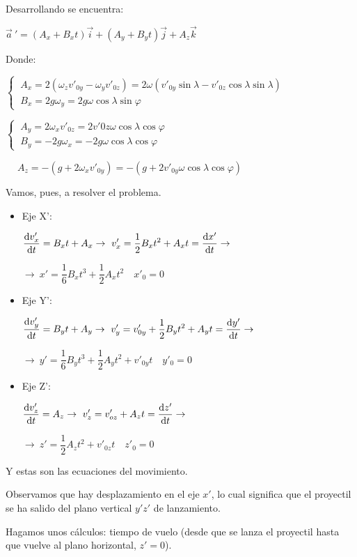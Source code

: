 Desarrollando se encuentra:

$\vec a\ '=(A_x+B_xt)\vec i+(A_y+B_yt)\vec j+A_z\vec k$

Donde:



$\begin{cases}
\ A_x=2(\omega_z v'_{0y}-\omega_y v'_{0z})=2\omega(v'_{0y}\sin \lambda-v'_{0z} \cos \lambda \sin \lambda	 )\\
\ B_x=2g\omega_y=2g\omega \cos \lambda \sin \varphi
\end{cases}$


$\begin{cases}
\ A_y=2\omega_xv'_{0z}=2v'0z \omega \cos \lambda \cos \varphi\\
\ B_y=-2g\omega_x=-2g\omega \cos \lambda \cos \varphi
\end{cases}$

$\quad \ A_z=-(g+2\omega_x v'_{0y})=-(g+2v'_{0y}\omega \cos \lambda \cos \varphi)$


Vamos, pues, a resolver el problema.

\begin{itemize}
\item Eje X':

$\displaystyle \dv{v'_x}{t}=B_xt+A_x \to \ v'_x=\dfrac 1 2 B_x t^2 + A_x t =\dv{x'}{t} \to$

$\to  \ x'=\dfrac 1 6 B_x t^3+\dfrac 1 2 A_x t^2\quad x'_0=0$
\item Eje Y':

$\displaystyle \dv{v'_y}{t}=B_y t+A_y \to \ v'_y=v'_{0y}+\dfrac 1 2 B_y t^2 + A_y t =\dv{y'}{t} \to$

$\to  \ y'=\dfrac 1 6 B_y t^3+\dfrac 1 2 A_y t^2 +v'_{0y}t \quad y'_0=0$
\item Eje Z':

$\displaystyle \dv{v'_z}{t}=A_z \to \ v'_z=v'_{oz}+ A_z t =\dv{z'}{t} \to$

$\to  \ z'=\dfrac 1 2 A_z t^2 + v'_{0z}t \quad z'_0=0$

\end{itemize}

Y estas son las ecuaciones del movimiento.

Observamos que hay desplazamiento en el eje $x'$, lo cual significa que el proyectil se ha salido del plano vertical $y'z'$ de lanzamiento.

Hagamos unos cálculos: tiempo de vuelo (desde que se lanza el proyectil hasta que vuelve al plano horizontal, $z'=0$).

